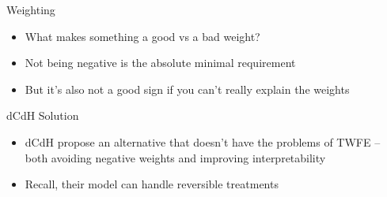 \documentclass{beamer}
\begin{document}
\begin{frame}{Weighting}

\begin{itemize}
\item What makes something a good vs a bad weight?
\item Not being negative is the absolute minimal requirement
\item But it's also not a good sign if you can't really explain the weights
\end{itemize}

\end{frame}

\begin{frame}{dCdH Solution}

\begin{itemize}
\item dCdH propose an alternative that doesn't have the problems of TWFE -- both avoiding negative weights and improving interpretability
\item Recall, their model can handle reversible treatments

\end{itemize}

\end{frame}
\end{document}
